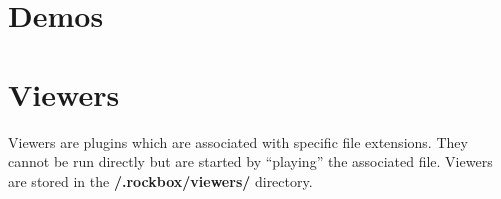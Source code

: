 {}











\section{Demos}


{}

{}



{}


{}



{}



\section{\label{ref:Viewersplugins}Viewers}

Viewers are plugins which are associated with specific file extensions.
They cannot be run directly but are started by ``playing''
the associated file. Viewers are stored in the
\textbf{/.rockbox/viewers/ }directory.

